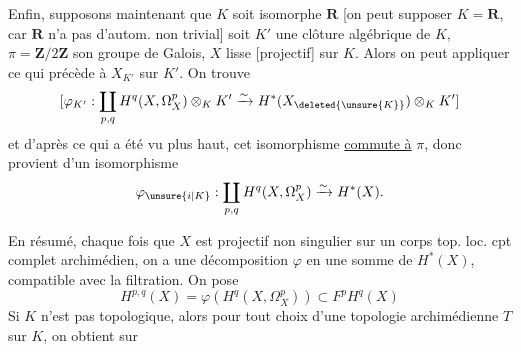 Enfin, supposons maintenant que $K$ soit isomorphe $\mathbf R$ [on peut supposer $K=\mathbf R$, car $\mathbf R$ n'a pas d'autom. non trivial] soit $K'$ une clôture algébrique de $K$, $\pi=\mathbf Z/2\mathbf Z$ son groupe de Galois, $X$ lisse  [projectif] sur $K$. Alors on peut appliquer ce qui précède à $X_{K'}$ sur $K'$. On trouve
\[
 [\varphi_{K'}:\coprod_{p,q}H^q(X,\Omega_X^p)\otimes_K K'
 \xrightarrow{\sim}H^*(X_{\deleted{\unsure{K}}})\otimes_K K']
\]
et d'après ce qui a été vu plus haut, cet isomorphisme \uline{commute à} $\pi$, donc provient d'un isomorphisme
\[
 \varphi_{\unsure{i|K}}:\coprod_{p,q}H^q(X,\Omega_X^p)\xrightarrow{\sim}H^*(X).
\]


En résumé, chaque fois que $X$ est projectif non singulier sur un corps  top. loc. cpt complet archimédien, on a une décomposition $\varphi$ en une somme de $H^*(X)$, compatible avec la filtration.  On pose
\[
 \boxed{H^{p,q}(X)=\varphi(H^q(X,\Omega_X^p))\subset F^pH^q(X)}
\]
Si $K$ n'est pas topologique, alors pour tout choix d'une topologie  archimédienne $T$ sur $K$, on obtient sur
